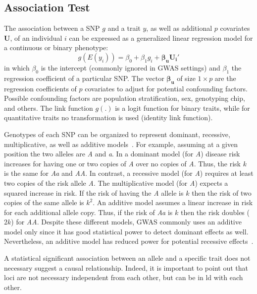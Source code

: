 \subsection{Association Test}
\label{sub:association_test}

The association between a SNP $g$ and a trait $y$, as well as additional $p$ covariates $\bm{U}$, of an individual $i$ can be expressed as a generalized linear regression model for a continuous or binary phenotype:
\begin{equation}
  g(E(y_i)) = \beta_0 + \beta_1g_i + \bm{\beta_u}\bm{U_i'}
\end{equation}
in which $\beta_0$ is the intercept (commonly ignored in GWAS settings) and $\beta_1$ the regression coefficient of a particular SNP\@.
The vector $\bm{\beta_u}$ of size $1\times p$ are the regression coefficients of $p$ covariates to adjust for potential confounding factors.
Possible confounding factors are population stratification, sex, genotyping chip, and others.
The link function $g(.)$ is a logit function for binary traits, while for quantitative traits no transformation is used (identity link function). 

Genotypes of each SNP can be organized to represent dominant, recessive, multiplicative, as well as additive models~\cite{Bush2012}.
For example, assuming at a given position the two alleles are \textit{A} and \textit{a}.
In a dominant model (for \textit{A}) disease risk increases for having one or two copies of \textit{A} over no copies of \textit{A}.
Thus, the risk $k$ is the same for \textit{Aa} and \textit{AA}.
In contrast, a recessive model (for \textit{A}) requires at least two copies of the risk allele \textit{A}.
The multiplicative model (for \textit{A}) expects a squared increase in risk.
If the risk of having the \textit{A} allele is $k$ then the risk of two copies of the same allele is $k^2$.
An additive model assumes a linear increase in risk for each additional allele copy.
Thus, if the risk of \textit{Aa} is $k$ then the risk doubles ($2k$) for \textit{AA}. 
Despite these different models, GWAS commonly uses an additive model only since it has good statistical power to detect dominant effects as well.
Nevertheless, an additive model has reduced power for potential recessive effects~\cite{Bush2012}.

A statistical significant association between an allele and a specific trait does not necessary suggest a causal relationship.
Indeed, it is important to point out that loci are not necessary independent from each other, but can be in \acrfull{ld} with each other.


